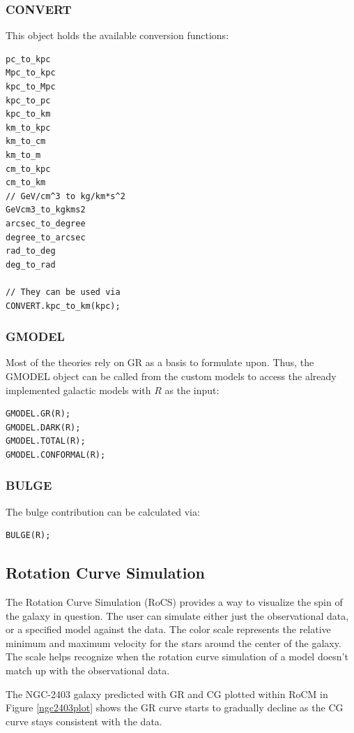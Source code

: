 \documentclass[conference]{IEEEtran}
\begin{document}
\subsubsection{CONVERT}
This object holds the available conversion functions:
\begin{lstlisting}
pc_to_kpc
Mpc_to_kpc
kpc_to_Mpc
kpc_to_pc
kpc_to_km
km_to_kpc
km_to_cm
km_to_m
cm_to_kpc
cm_to_km
// GeV/cm^3 to kg/km*s^2
GeVcm3_to_kgkms2
arcsec_to_degree
degree_to_arcsec
rad_to_deg
deg_to_rad

// They can be used via
CONVERT.kpc_to_km(kpc);
\end{lstlisting}

\subsubsection{GMODEL}
Most of the theories rely on GR as a basis to formulate upon. Thus, the GMODEL object can be called from the custom models to access the already implemented galactic models with $R$ as the input:
\begin{lstlisting}
GMODEL.GR(R);
GMODEL.DARK(R);
GMODEL.TOTAL(R);
GMODEL.CONFORMAL(R);
\end{lstlisting}

\subsubsection{BULGE}
The bulge contribution can be calculated via:
\begin{lstlisting}
BULGE(R);
\end{lstlisting}


\subsection{Rotation Curve Simulation}

The Rotation Curve Simulation (RoCS) provides a way to visualize the spin of the galaxy in question. The user can simulate either just the observational data, or a specified model against the data. The color scale represents the relative {\color[HTML]{EA051C} minimum} and {\color[HTML]{1AAF3A} maximum} velocity for the stars around the center of the galaxy. The scale helps recognize when the rotation curve simulation of a model doesn't match up with the observational data.

The NGC-2403 galaxy predicted with GR and CG plotted within RoCM in Figure \ref{ngc2403plot} shows the GR curve starts to gradually decline as the CG curve stays consistent with the data.
\end{document}
